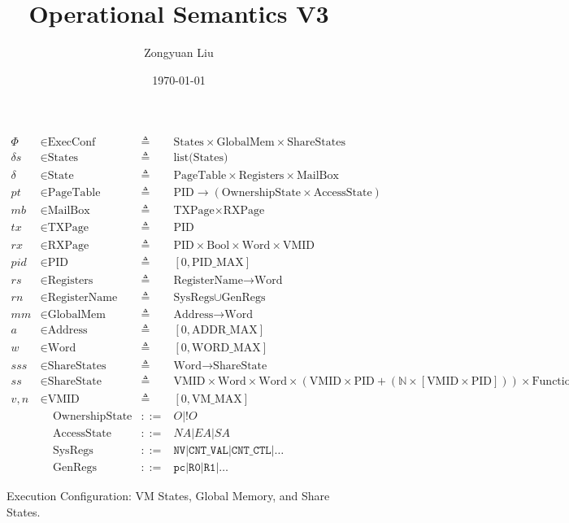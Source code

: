 \documentclass[a4paper]{article}
\title{Operational Semantics V3} \date{\today}
\author{Zongyuan Liu}
\newcommand*{\defined}{\triangleq}
\newcommand*{\maps}{\rightarrow}
\newcommand*{\derived}{::=}
\newcommand*{\CONF}{\text{ExecConf}}
\newcommand*{\STATE}{\text{State}}
\newcommand*{\MEM}{\text{GlobalMem}}
\newcommand*{\SSS}{\text{ShareStates}}
\newcommand*{\PID}{\text{PID}}
\newcommand*{\PT}{\text{PageTable}}
\newcommand*{\AS}{\text{AccessState}}
\newcommand*{\OS}{\text{OwnershipState}}
\newcommand*{\REGS}{\text{Registers}}
\newcommand*{\ADDR}{\text{Address}}
\newcommand*{\WORD}{\text{Word}}
\newcommand*{\VMID}{\text{VMID}}
\newcommand*{\REGNAMES}{\text{RegisterName}}
\newcommand*{\MB}{\text{MailBox}}
\newcommand*{\PAMAX}{\text{ADDR\_MAX}}
\newcommand*{\PPIDMAX}{\text{PID\_MAX}}
\newcommand*{\PWMAX}{\text{WORD\_MAX}}
\newcommand*{\PVMMAX}{\text{VM\_MAX}}
\begin{document}

\begin{figure}[!htb]
  \begin{align*}
    \Phi &\in \CONF &\defined &\text{States} \times \MEM \times \SSS \\
    \delta s &\in \text{States} &\defined &\text{list(States)} \\
    \delta &\in \STATE &\defined &\PT \times \REGS \times \MB \\
    pt & \in \PT & \defined & \PID \maps (\OS \times \AS) \\
    mb & \in \MB &\defined &\text{TXPage} \times  \text{RXPage}\\
    tx & \in \text{TXPage} &\defined &\PID\\
    rx & \in \text{RXPage} &\defined &\PID \times \text{Bool} \times \WORD \times \VMID \\
    pid & \in \PID &\defined  &[ 0, \PPIDMAX ] \\
    rs & \in \REGS &\defined  &\REGNAMES \maps \WORD \\
    rn & \in \REGNAMES &\defined &\text{SysRegs} \cup \text{GenRegs} \\
    mm & \in \MEM &\defined  &\ADDR \maps \WORD \\
    a & \in \ADDR &\defined  &[ 0, \PAMAX ] \\
    w & \in \WORD &\defined  &[ 0, \PWMAX ] \\
    sss & \in \SSS &\defined  &\WORD \maps \text{ShareState} \\
    ss & \in \text{ShareState} &\defined &\VMID \times \WORD \times \WORD \times (\VMID \times \PID + (\mathbb{N} \times [\VMID \times \PID])) \times \text{FunctionID}\\
    v,n & \in \VMID &\defined  &[ 0, \PVMMAX ] \\
      & \;\;\;\; \OS & \derived & O | !O \\
      & \;\;\;\; \AS & \derived & NA | EA | SA \\
      & \;\;\;\; \text{SysRegs} &\derived & \mathtt{NV} | \mathtt{CNT\_VAL} | \mathtt{CNT\_CTL} | \dots \\
         & \;\;\;\; \text{GenRegs} &\derived & \mathtt{pc} | \mathtt {R0} | \mathtt{R1} | \dots
  \end{align*}
  \caption{Execution Configuration: VM States, Global Memory, and Share States.}
\end{figure}
\end{document}
